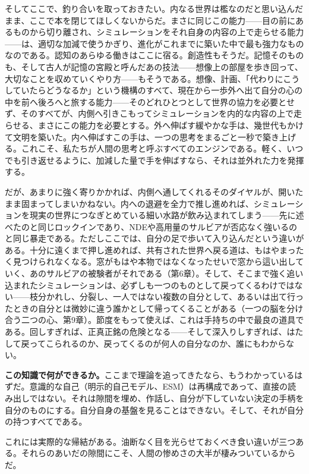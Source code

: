 \documentclass[11pt, twoside, openright]{book}
\begin{document}
そしてここで、釣り合いを取っておきたい。内なる世界は檻なのだと思い込んだまま、ここで本を閉じてほしくないからだ。まさに同じこの能力------目の前にあるものから切り離され、シミュレーションをそれ自身の内容の上で走らせる能力------は、適切な加減で使うかぎり、進化がこれまでに築いた中で最も強力なものなのである。認知のあらゆる働きはここに宿る。創造性もそうだ。記憶そのものも、そして古人が記憶の宮殿と呼んだあの技法------想像上の部屋を歩き回って、大切なことを収めていくやり方------もそうである。想像、計画、「代わりにこうしていたらどうなるか」という機構のすべて、現在から一歩外へ出て自分の心の中を前へ後ろへと旅する能力------そのどれひとつとして世界の協力を必要とせず、そのすべてが、内側へ引きこもってシミュレーションを内的な内容の上で走らせる、まさにこの能力を必要とする。外へ伸ばす緩やかな手は、幾世代もかけて文明を築いた。内へ伸ばすこの手は、一つの思考をまるごと一秒で築き上げる。これこそ、私たちが人間の思考と呼ぶすべてのエンジンである。軽く、いつでも引き返せるように、加減した量で手を伸ばすなら、それは並外れた力を発揮する。

だが、あまりに強く寄りかかれば、内側へ通してくれるそのダイヤルが、開いたまま固まってしまいかねない。内への退避を全力で推し進めれば、シミュレーションを現実の世界につなぎとめている細い水路が飲み込まれてしまう------先に述べたのと同じロックインであり、NDEや高用量のサルビアが否応なく強いるのと同じ暴走である。ただしここでは、自分の足で歩いて入り込んだという違いがある。十分に遠くまで押し進めれば、共有された世界へ戻る道は、もはやまったく見つけられなくなる。窓がもはや本物ではなくなったせいで窓から這い出していく、あのサルビアの被験者がそれである（第6章）。そして、そこまで強く追い込まれたシミュレーションは、必ずしも一つのものとして戻ってくるわけではない------枝分かれし、分裂し、一人ではない複数の自分として、あるいは出て行ったときの自分とは微妙に違う誰かとして帰ってくることがある（一つの脳を分け合う二つの心、第9章）。節度をもって使えば、これは手持ちの中で最良の道具である。回しすぎれば、正真正銘の危険となる------そして深入りしすぎれば、はたして戻ってこられるのか、戻ってくるのが何人の自分なのか、誰にもわからない。

\textbf{この知識で何ができるか。}ここまで理論を追ってきたなら、もうわかっているはずだ。意識的な自己（明示的自己モデル、ESM）は再構成であって、直接の読み出しではない。それは隙間を埋め、作話し、自分が下していない決定の手柄を自分のものにする。自分自身の基盤を見ることはできない。そして、それが自分の持つすべてである。

これには実際的な帰結がある。油断なく目を光らせておくべき食い違いが三つある。それらのあいだの隙間にこそ、人間の惨めさの大半が棲みついているからだ。
\end{document}
